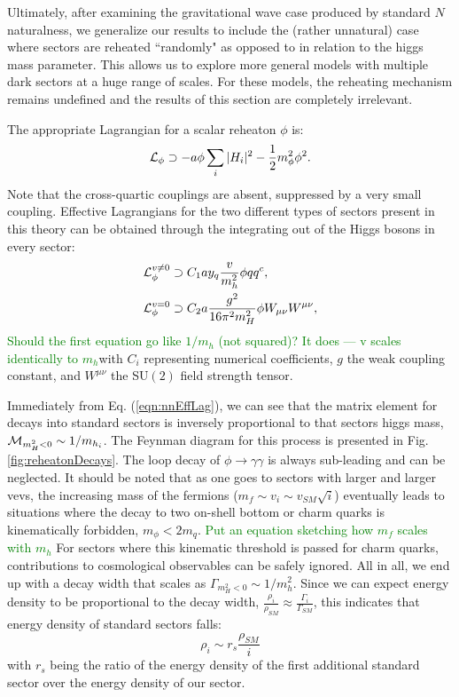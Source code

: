 \documentclass[nofootinbib,twocolumn,preprintnumbers]{revtex4-1}
\begin{document}
Ultimately, after examining the gravitational wave case produced by standard $N$naturalness, we generalize our results to include the (rather unnatural) case where sectors are reheated ``randomly" as opposed to in relation to the higgs mass parameter. This allows us to explore more general models with multiple dark sectors at a huge range of scales. For these models, the reheating mechanism remains undefined and the results of this section are completely irrelevant. 

The appropriate Lagrangian for a scalar reheaton $\phi$ is: 
\begin{equation}\label{eqn:nnLagrangian}
{\cal L}_\phi \supset -a\phi\sum_i\vert H_i\vert^2 - \frac{1}{2}m^2_\phi \phi^2.
\end{equation}
Note that the cross-quartic couplings are absent, suppressed by a very small coupling. Effective Lagrangians for the two different types of sectors present in this theory can be obtained through the integrating out of the Higgs bosons in every sector:
\begin{equation}\label{eqn:nnEffLag}
\begin{split}
{\cal L}_\phi^{v \neq 0} &\supset C_1 a y_q\frac{v}{m_h^2}\phi q q^c,
\\
{\cal L}_\phi^{v = 0} &\supset C_2 a \frac{g^2}{16\pi^2 m_H^2}\phi W_{\mu\nu}W^{\mu\nu},
\end{split}
\end{equation}
\textcolor{green}{Should the first equation go like $1/m_h$ (not squared)? It does --- v scales identically to $m_h$}with $C_i$ representing numerical coefficients, $g$ the weak coupling constant, and $W^{\mu\nu}$ the SU$(2)$ field strength tensor.

Immediately from Eq. (\ref{eqn:nnEffLag}), we can see that the matrix element for decays into standard sectors is inversely proportional to that sectors higgs mass, ${\cal M}_{m_H^2 < 0} \sim 1/m_{h_i}$. The Feynman diagram for this process is presented in Fig. \ref{fig:reheatonDecays}. The loop decay of $\phi \rightarrow \gamma\gamma$ is always sub-leading and can be neglected. It should be noted that as one goes to sectors with larger and larger vevs, the increasing mass of the fermions ($m_f \sim v_i \sim v_{SM}\sqrt{i}$) eventually leads to situations where the decay to two on-shell bottom or charm quarks is kinematically forbidden, $m_\phi < 2 m_q$. \textcolor{green}{Put an equation sketching how $m_f$ scales with $m_h$} For sectors where this kinematic threshold is passed for charm quarks, contributions to cosmological observables can be safely ignored. All in all, we end up with a decay width that scales as $\Gamma_{m_H^2<0} \sim 1/m_h^2$. Since we can expect energy density to be proportional to the decay width, $\frac{\rho_i}{\rho_{SM}} \approx \frac{\Gamma_i}{\Gamma_{SM}}$, this indicates that energy density of standard sectors falls:
\begin{equation}\label{eqn:edSS}
\rho_i \sim r_{s}\frac{\rho_{SM}}{i}
\end{equation} 
with $r_s$ being the ratio of the energy density of the first additional standard sector over the energy density of our sector.
\end{document}
